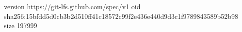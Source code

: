 version https://git-lfs.github.com/spec/v1
oid sha256:15bfdd5d0cb3b2d510ff41c18572c99f2e436e440d9d3c1f9789843589b52b98
size 197999
